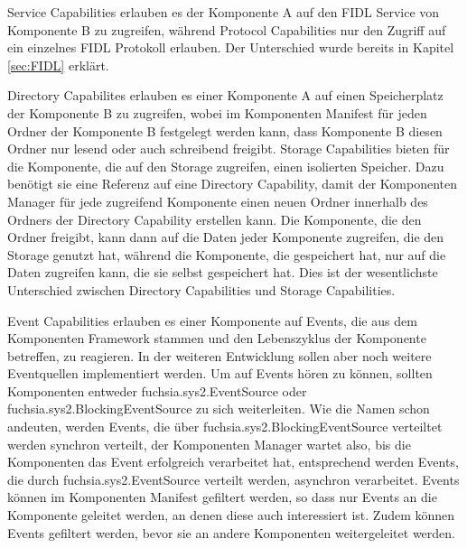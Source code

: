 \documentclass[a4paper]{scrartcl}
\begin{document}
Service Capabilities erlauben es der Komponente A auf den FIDL Service von Komponente B zu zugreifen, während Protocol Capabilities nur den Zugriff auf ein einzelnes FIDL Protokoll erlauben. Der Unterschied wurde bereits in Kapitel \ref{sec:FIDL} erklärt.

Directory Capabilites erlauben es einer Komponente A auf einen Speicherplatz der Komponente B zu zugreifen, wobei im Komponenten Manifest für jeden Ordner der Komponente B festgelegt werden kann, dass Komponente B diesen Ordner nur lesend oder auch schreibend freigibt. Storage Capabilities bieten für die Komponente, die auf den Storage zugreifen, einen isolierten Speicher. Dazu benötigt sie eine Referenz auf eine Directory Capability, damit der Komponenten Manager für jede zugreifend Komponente einen neuen Ordner innerhalb des Ordners der Directory Capability erstellen kann. Die Komponente, die den Ordner freigibt, kann dann auf die Daten jeder Komponente zugreifen, die den Storage genutzt hat, während die Komponente, die gespeichert hat, nur auf die Daten zugreifen kann, die sie selbst gespeichert hat. Dies ist der wesentlichste Unterschied zwischen Directory Capabilities und Storage Capabilities.

Event Capabilities erlauben es einer Komponente auf Events, die aus dem Komponenten Framework stammen und den Lebenszyklus der Komponente betreffen, zu reagieren. In der weiteren Entwicklung sollen aber noch weitere Eventquellen implementiert werden. Um auf Events hören zu können, sollten Komponenten entweder fuchsia.sys2.EventSource oder fuchsia.sys2.BlockingEventSource zu sich weiterleiten. Wie die Namen schon andeuten, werden Events, die über fuchsia.sys2.BlockingEventSource verteiltet werden synchron verteilt, der Komponenten Manager wartet also, bis die Komponenten das Event erfolgreich verarbeitet hat, entsprechend werden Events, die durch fuchsia.sys2.EventSource verteilt werden, asynchron verarbeitet. Events können im Komponenten Manifest gefiltert werden, so dass nur Events an die Komponente geleitet werden, an denen diese auch interessiert ist. Zudem können Events gefiltert werden, bevor sie an andere Komponenten weitergeleitet werden. \cite{Fuchsia.Component.Events}
\end{document}
